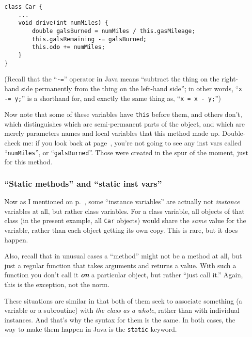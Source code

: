\begin{Verbatim}[samepage=true,fontsize=\footnotesize,frame=single]
class Car {
    ...
    void drive(int numMiles) {
        double galsBurned = numMiles / this.gasMileage;
        this.galsRemaining -= galsBurned;
        this.odo += numMiles;
    }
}
\end{Verbatim}

(Recall that the ``\texttt{-=}'' operator in Java means ``subtract the thing on
the right-hand side permanently from the thing on the left-hand side''; in other
words, ``\texttt{x -= y;}'' is a shorthand for, and exactly the same thing as,
``\texttt{x = x - y;}'')

Now note that some of these variables have \texttt{this} before them, and others
don't, which distinguishes which are semi-permanent parts of the object, and
which are merely parameters names and local variables that this method made up.
Double-check me: if you look back at page~\pageref{fig:classObject}, you're not
going to see any inst vars called ``\texttt{numMiles}'', or
``\texttt{galsBurned}''. Those were created in the spur of the moment, just
for this method.

\subsubsection{``Static methods'' and ``static inst vars''}

Now as I mentioned on p.~\pageref{mentionStatic}, some ``instance variables''
are actually not \textit{instance} variables at all, but rather class
variables. For a class variable, all objects of that class (in the present
example, all \texttt{Car} objects) would share the \textit{same} value for the
variable, rather than each object getting its own copy. This is rare, but it
does happen.

Also, recall that in unusual cases a ``method'' might not be a method at all,
but just a regular function that takes arguments and returns a value. With such
a function you don't call it \textbf{\textit{on}} a particular object, but
rather ``just call it.'' Again, this is the exception, not the norm.

These situations are similar in that both of them seek to associate something
(a variable or a subroutine) with \textit{the class as a whole}, rather than
with individual instances. And that's why the syntax for them is the same. In
both cases, the way to make them happen in Java is the \texttt{static} keyword.

